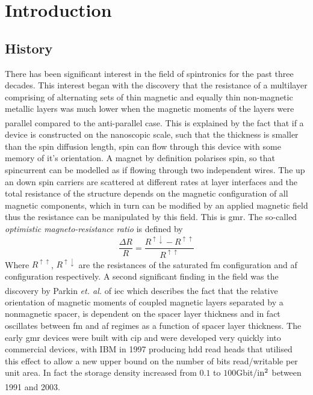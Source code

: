 \documentclass[a4paper, 12pt]{article}
\begin{document}
	\section{Introduction}
	\subsection{History}
	There has been significant interest in the field of spintronics for the past three decades. This interest began with the discovery that the resistance of a multilayer comprising of alternating sets of thin magnetic and equally thin non-magnetic metallic layers was much lower when the magnetic moments of the layers were parallel compared to the anti-parallel case\textcolor{blue}{\textsuperscript{\cite{rev3, GMR1, GMR2}}}. This is explained by the fact that if a device is constructed on the nanoscopic scale, such that the thickness is smaller than the spin diffusion length, spin can flow through this device with some memory of it's orientation. A magnet by definition polarises spin, so that spincurrent can be modelled as if flowing through two independent wires. The up an down spin carriers are scattered at different rates at layer interfaces and the total resistance of the structure depends on the magnetic configuration of all magnetic components, which in turn can be modified by an applied magnetic field thus the resistance can be manipulated by this field. 
This is \gls{gmr}. The so-called {\it optimistic magneto-resistance ratio} is defined by
	\begin{equation}
		\frac{\Delta R}{R}=\frac{R^{\uparrow \downarrow}-R^{\uparrow\uparrow}}{R^{\uparrow\uparrow}}
	\end{equation}
	Where $R^{\uparrow\uparrow}$, $R^{\uparrow\downarrow}$ are the resistances of the saturated \gls{fm} configuration and \gls{af} configuration respectively. 
	A second significant finding in the field was the discovery by Parkin \textit{et. al.}\textcolor{blue}{\textsuperscript{\cite{Parkin}}} of \gls{iec} 
	which describes the fact that the relative orientation of magnetic moments of coupled magnetic layers separated by a nonmagnetic spacer, is dependent on the spacer layer thickness and in fact oscillates between \gls{fm} and \gls{af} regimes as a function of spacer layer thickness. 
	The early \gls{gmr} devices were built with \gls{cip} and were developed very quickly into commercial devices, with IBM in 1997 producing \gls{hdd} read heads that utilised this effect to allow a new upper bound on the number of bits read/writable per unit area. In fact the storage density increased from $0.1$ to $100$Gbit/i$\rm n^2$ between 1991 and 2003\textcolor{blue}{\textsuperscript{\cite{Mathon2016}}}.  
\end{document}
